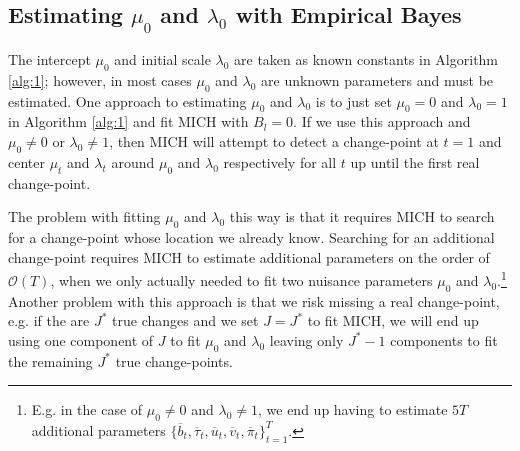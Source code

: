 \subsection{Estimating \texorpdfstring{$\mu_0$}{mu0} and \texorpdfstring{$\lambda_0$}{lambda0} with Empirical Bayes}
\label{app:empirical-bayes}

The intercept $\mu_0$ and initial scale $\lambda_0$ are taken as known constants in Algorithm \ref{alg:1}; however, in most cases $\mu_0$ and $\lambda_0$ are unknown parameters and must be estimated. One approach to estimating $\mu_0$ and $\lambda_0$ is to just set $\mu_0 = 0$ and $\lambda_0 = 1$ in Algorithm \ref{alg:1} and fit MICH with $B_l = 0$. If we use this approach and $\mu_0 \neq 0$ or $\lambda_0 \neq 1$, then MICH will attempt to detect a change-point at $t=1$ and center $\mu_{t}$ and $\lambda_t$ around $\mu_0$ and $\lambda_0$ respectively for all $t$ up until the first real change-point.

The problem with fitting $\mu_0$ and $\lambda_0$ this way is that it requires MICH to search for a change-point whose location we already know. Searching for an additional change-point requires MICH to estimate additional parameters on the order of $\mathcal{O}(T)$, when we only actually needed to fit two nuisance parameters $\mu_0$ and $\lambda_0$.\footnote{E.g. in the case of $\mu_0 \neq 0$ and $\lambda_0 \neq 1$, we end up having to estimate $5T$ additional parameters $\{\overline{b}_t, \overline{\tau}_t, \overline{u}_t, \overline{v}_t, \overline{\pi}_t\}_{t=1}^T$.} Another problem with this approach is that we risk missing a real change-point, e.g. if the are $J^*$ true changes and we set $J=J^*$ to fit MICH, we will end up using one component of $J$ to fit $\mu_0$ and $\lambda_0$ leaving only $J^*-1$ components to fit the remaining $J^*$ true change-points. 

